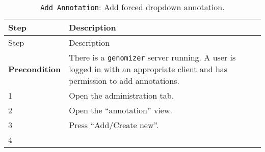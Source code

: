 \begin{longtable}[c]{@{}ll@{}}
\caption{\texttt{Add\ Annotation}: Add forced dropdown
annotation.}\tabularnewline
\toprule
\begin{minipage}[b]{0.31\columnwidth}\raggedright\strut
Step
\strut\end{minipage} &
\begin{minipage}[b]{0.63\columnwidth}\raggedright\strut
Description
\strut\end{minipage}\tabularnewline
\midrule
\endfirsthead
\toprule
\begin{minipage}[b]{0.31\columnwidth}\raggedright\strut
Step
\strut\end{minipage} &
\begin{minipage}[b]{0.63\columnwidth}\raggedright\strut
Description
\strut\end{minipage}\tabularnewline
\midrule
\endhead
\begin{minipage}[t]{0.31\columnwidth}\raggedright\strut
\textbf{Precondition}
\strut\end{minipage} &
\begin{minipage}[t]{0.63\columnwidth}\raggedright\strut
There is a \texttt{genomizer} server running. A user is logged in with
an appropriate client and has permission to add annotations.
\strut\end{minipage}\tabularnewline
\begin{minipage}[t]{0.31\columnwidth}\raggedright\strut
1
\strut\end{minipage} &
\begin{minipage}[t]{0.63\columnwidth}\raggedright\strut
Open the administration tab.
\strut\end{minipage}\tabularnewline
\begin{minipage}[t]{0.31\columnwidth}\raggedright\strut
2
\strut\end{minipage} &
\begin{minipage}[t]{0.63\columnwidth}\raggedright\strut
Open the ``annotation'' view.
\strut\end{minipage}\tabularnewline
\begin{minipage}[t]{0.31\columnwidth}\raggedright\strut
3
\strut\end{minipage} &
\begin{minipage}[t]{0.63\columnwidth}\raggedright\strut
Press ``Add/Create new''.
\strut\end{minipage}\tabularnewline
\begin{minipage}[t]{0.31\columnwidth}\raggedright\strut
4
\strut\end{minipage} &

\end{longtable}
